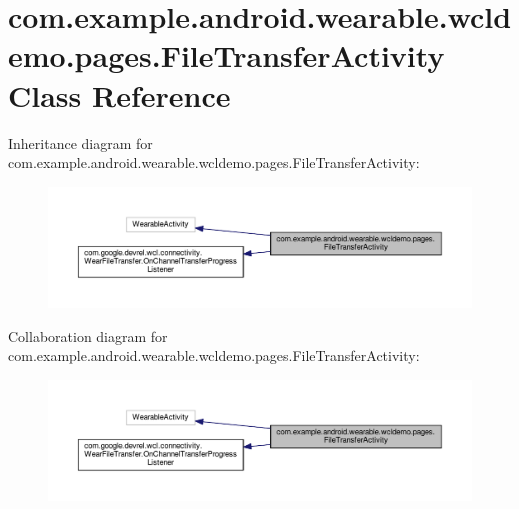 \hypertarget{classcom_1_1example_1_1android_1_1wearable_1_1wcldemo_1_1pages_1_1FileTransferActivity}{}\section{com.\+example.\+android.\+wearable.\+wcldemo.\+pages.\+File\+Transfer\+Activity Class Reference}
\label{classcom_1_1example_1_1android_1_1wearable_1_1wcldemo_1_1pages_1_1FileTransferActivity}


Inheritance diagram for com.\+example.\+android.\+wearable.\+wcldemo.\+pages.\+File\+Transfer\+Activity\+:
\nopagebreak
\begin{figure}[H]
\begin{center}
\leavevmode
\includegraphics[width=350pt]{d9/d98/classcom_1_1example_1_1android_1_1wearable_1_1wcldemo_1_1pages_1_1FileTransferActivity__inherit__graph}
\end{center}
\end{figure}


Collaboration diagram for com.\+example.\+android.\+wearable.\+wcldemo.\+pages.\+File\+Transfer\+Activity\+:
\nopagebreak
\begin{figure}[H]
\begin{center}
\leavevmode
\includegraphics[width=350pt]{d0/d4d/classcom_1_1example_1_1android_1_1wearable_1_1wcldemo_1_1pages_1_1FileTransferActivity__coll__graph}
\end{center}
\end{figure}
